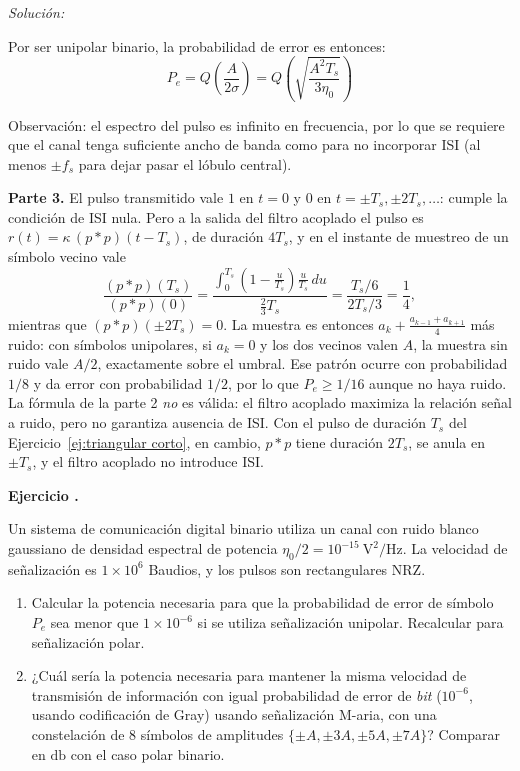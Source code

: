 \documentclass[a4paper,11pt]{article}
\newcounter{numejer}[section]
\newenvironment{ejercicio}[1][]{
\refstepcounter{numejer}
\noindent \large \textbf{Ejercicio \arabic{section}.\arabic{numejer}} \ifthenelse{\equal{#1}{}}{}{\emph{(#1)}}

\smallskip
}{
\bigskip
}
\newenvironment{solucion}[1][]{
\noindent \large \textsl{Solución:} \ifthenelse{\equal{#1}{}}{}{\emph{(#1)}}

\smallskip
}{
\bigskip
}
\begin{document}
\begin{solucion}
        Por ser unipolar binario, la probabilidad de error es entonces:
        \begin{equation*}
                P_e = Q\left(\frac{A}{2\sigma}\right) = Q\left(\sqrt{\frac{A^2 T_s}{3\eta_0}}\right)
        \end{equation*}

        Observación: el espectro del pulso es infinito en frecuencia, por lo que se requiere que el canal tenga suficiente ancho de banda como para no incorporar ISI (al menos $\pm f_s$ para dejar pasar el lóbulo central).

        \textbf{Parte 3.} El pulso transmitido vale $1$ en $t=0$ y $0$ en $t=\pm T_s,\pm 2T_s,\ldots$: cumple la condición de ISI nula. Pero a la salida del filtro acoplado el pulso es $r(t)=\kappa\,(p*p)(t-T_s)$, de duración $4T_s$, y en el instante de muestreo de un símbolo vecino vale
        \begin{equation*}
                \frac{(p*p)(T_s)}{(p*p)(0)}=\frac{\int_0^{T_s}\left(1-\frac{u}{T_s}\right)\frac{u}{T_s}\,du}{\frac23 T_s}=\frac{T_s/6}{2T_s/3}=\frac14,
        \end{equation*}
        mientras que $(p*p)(\pm 2T_s)=0$. La muestra es entonces $a_k+\frac{a_{k-1}+a_{k+1}}{4}$ más ruido: con símbolos unipolares, si $a_k=0$ y los dos vecinos valen $A$, la muestra sin ruido vale $A/2$, exactamente sobre el umbral. Ese patrón ocurre con probabilidad $1/8$ y da error con probabilidad $1/2$, por lo que $P_e\geqslant 1/16$ aunque no haya ruido. La fórmula de la parte 2 \emph{no} es válida: el filtro acoplado maximiza la relación señal a ruido, pero no garantiza ausencia de ISI. Con el pulso de duración $T_s$ del Ejercicio~\ref{ej:triangular corto}, en cambio, $p*p$ tiene duración $2T_s$, se anula en $\pm T_s$, y el filtro acoplado no introduce ISI.
\end{solucion}

\begin{ejercicio}
Un sistema de comunicación digital binario utiliza un canal con ruido blanco gaussiano de densidad espectral de potencia $\eta_0/2=10^{-15}\ \unit{\square\volt/\hertz}$. La velocidad de señalización es $1\times 10^6$ Baudios, y los pulsos son rectangulares NRZ.
\begin{enumerate}
\item Calcular la potencia necesaria para que la probabilidad de error de símbolo $P_e$ sea menor que $1\times 10^{-6}$ si se utiliza señalización unipolar. Recalcular para señalización polar.
\item ¿Cuál sería la potencia necesaria para mantener la misma velocidad de transmisión de información con igual probabilidad de error de \emph{bit} ($10^{-6}$, usando codificación de Gray) usando señalización M-aria, con una constelación de 8 símbolos de amplitudes $\{\pm A,\pm 3A,\pm 5A,\pm 7A\}$? Comparar en $\unit{\decibel}$ con el caso polar binario.
\end{enumerate}
\end{ejercicio}
\end{document}
